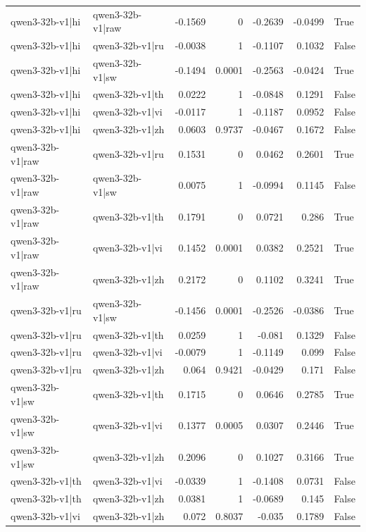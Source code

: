 \begin{table}
\begin{tabular}{l l r r r r l}
qwen3-32b-v1|hi & qwen3-32b-v1|raw & -0.1569 & 0 & -0.2639 & -0.0499 & True \\
qwen3-32b-v1|hi & qwen3-32b-v1|ru & -0.0038 & 1 & -0.1107 & 0.1032 & False \\
qwen3-32b-v1|hi & qwen3-32b-v1|sw & -0.1494 & 0.0001 & -0.2563 & -0.0424 & True \\
qwen3-32b-v1|hi & qwen3-32b-v1|th & 0.0222 & 1 & -0.0848 & 0.1291 & False \\
qwen3-32b-v1|hi & qwen3-32b-v1|vi & -0.0117 & 1 & -0.1187 & 0.0952 & False \\
qwen3-32b-v1|hi & qwen3-32b-v1|zh & 0.0603 & 0.9737 & -0.0467 & 0.1672 & False \\
qwen3-32b-v1|raw & qwen3-32b-v1|ru & 0.1531 & 0 & 0.0462 & 0.2601 & True \\
qwen3-32b-v1|raw & qwen3-32b-v1|sw & 0.0075 & 1 & -0.0994 & 0.1145 & False \\
qwen3-32b-v1|raw & qwen3-32b-v1|th & 0.1791 & 0 & 0.0721 & 0.286 & True \\
qwen3-32b-v1|raw & qwen3-32b-v1|vi & 0.1452 & 0.0001 & 0.0382 & 0.2521 & True \\
qwen3-32b-v1|raw & qwen3-32b-v1|zh & 0.2172 & 0 & 0.1102 & 0.3241 & True \\
qwen3-32b-v1|ru & qwen3-32b-v1|sw & -0.1456 & 0.0001 & -0.2526 & -0.0386 & True \\
qwen3-32b-v1|ru & qwen3-32b-v1|th & 0.0259 & 1 & -0.081 & 0.1329 & False \\
qwen3-32b-v1|ru & qwen3-32b-v1|vi & -0.0079 & 1 & -0.1149 & 0.099 & False \\
qwen3-32b-v1|ru & qwen3-32b-v1|zh & 0.064 & 0.9421 & -0.0429 & 0.171 & False \\
qwen3-32b-v1|sw & qwen3-32b-v1|th & 0.1715 & 0 & 0.0646 & 0.2785 & True \\
qwen3-32b-v1|sw & qwen3-32b-v1|vi & 0.1377 & 0.0005 & 0.0307 & 0.2446 & True \\
qwen3-32b-v1|sw & qwen3-32b-v1|zh & 0.2096 & 0 & 0.1027 & 0.3166 & True \\
qwen3-32b-v1|th & qwen3-32b-v1|vi & -0.0339 & 1 & -0.1408 & 0.0731 & False \\
qwen3-32b-v1|th & qwen3-32b-v1|zh & 0.0381 & 1 & -0.0689 & 0.145 & False \\
qwen3-32b-v1|vi & qwen3-32b-v1|zh & 0.072 & 0.8037 & -0.035 & 0.1789 & False \\
\bottomrule
\end{tabular}
\end{table}
